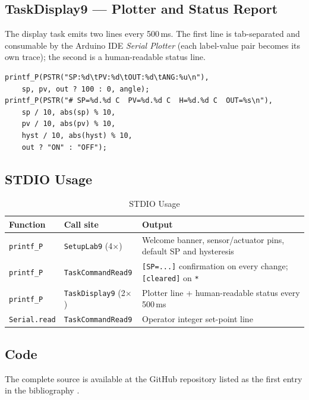 \documentclass[12pt]{article}
\begin{document}
\subsection{TaskDisplay9 --- Plotter and Status Report}

The display task emits two lines every 500\,ms. The first line is tab-separated and consumable by the Arduino IDE \emph{Serial Plotter} (each label-value pair becomes its own trace); the second is a human-readable status line.

\begin{lstlisting}[caption={TaskDisplay9 --- 500\,ms status output}]
printf_P(PSTR("SP:%d\tPV:%d\tOUT:%d\tANG:%u\n"),
    sp, pv, out ? 100 : 0, angle);
printf_P(PSTR("# SP=%d.%d C  PV=%d.%d C  H=%d.%d C  OUT=%s\n"),
    sp / 10, abs(sp) % 10,
    pv / 10, abs(pv) % 10,
    hyst / 10, abs(hyst) % 10,
    out ? "ON" : "OFF");
\end{lstlisting}

\subsection{STDIO Usage}

\begin{table}[H]
\centering
\begin{tabular}{@{}lp{4cm}p{6.0cm}@{}}
\toprule
\textbf{Function} & \textbf{Call site} & \textbf{Output} \\
\midrule
\texttt{printf\_P} & \texttt{SetupLab9} (4$\times$) & Welcome banner, sensor/actuator pins, default SP and hysteresis \\
\texttt{printf\_P} & \texttt{TaskCommandRead9}      & \texttt{[SP=...]} confirmation on every change; \texttt{[cleared]} on \texttt{*} \\
\texttt{printf\_P} & \texttt{TaskDisplay9} (2$\times$) & Plotter line + human-readable status every 500\,ms \\
\texttt{Serial.read} & \texttt{TaskCommandRead9}    & Operator integer set-point line \\
\bottomrule
\end{tabular}
\caption{STDIO Usage}
\label{tab:stdio}
\end{table}

\subsection{Code}

The complete source is available at the GitHub repository listed as the first entry in the bibliography \cite{code}.
\end{document}
